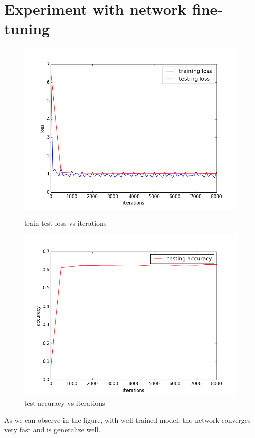 \documentclass{article} %
\begin{document}
\section{Experiment with network fine-tuning}
\begin{figure}[H]
    \begin{minipage}{0.5\linewidth}
        \centering
        \includegraphics[scale=0.35]{finetune_1.png}
        \caption{train-test loss vs iterations}
    \end{minipage}
    \begin{minipage}{0.5\linewidth}
        \centering
        \includegraphics[scale=0.35]{finetune_2.png}
     \caption{test accuracy vs iterations}
    \end{minipage}
\end{figure}
As we can observe in the figure, with well-trained model, the network converges very fast and is generalize well.
\end{document}
